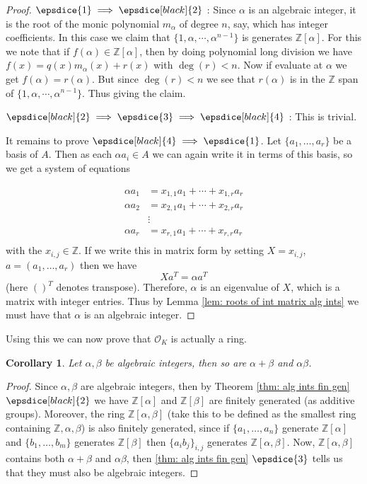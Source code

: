 \documentclass[11pt,a4paper]{report}
\theoremstyle{plain}
\newtheorem{cor}[subsection]{Corollary}
\theoremstyle{definition}
\theoremstyle{definition}
\newcommand{\ZZ}{\mathbb{Z}}
\def\edbb{\epsdice[black]{2}}
\def \a{\alpha}
\def \OO {\mathcal{O}}
\begin{document}
	\begin{proof}
		$\epsdice{1} \implies \epsdice[black]{2}$ : Since $\a$ is an algebraic integer, it is the root of the monic polynomial $m_\a$ of degree $n$, say, which has integer coefficients. In this case we claim that $\{1,\a,\cdots,\a^{n-1}\}$ is generates $\ZZ[\a]$. For this we note that if $f(\a) \in \ZZ[\a]$, then by doing polynomial long division we have $f(x)=q(x)m_\a(x)+r(x)$ with $\deg(r)<n$. Now if evaluate at $\a$ we get $f(\a)=r(\a)$. But since $\deg(r)<n$ we see that $r(\a)$ is in the $\ZZ$ span of  $\{1,\a,\cdots,\a^{n-1}\}$. Thus giving the claim.
		
		$\epsdice[black]{2} \implies \epsdice{3} \implies \epsdice[black]{4}$ : This is trivial.
		
		It remains to prove $\epsdice[black]{4} \implies \epsdice{1}$. Let $\{a_1,\dots,a_r\}$ be a basis of $A$. Then as each $\a a_i \in A$ we can again write it in terms of this basis, so we get a system of equations 
		
		\begin{align*}
			\a a_1 &=x_{1,1} a_1+\cdots+x_{1,r}a_r  \\
			\a a_2 &=x_{2,1} a_1+\cdots+x_{2,r}a_r  \\
			&\vdots \\
			\a a_r &=x_{r,1} a_1+\cdots+x_{r,r}a_r  \\
		\end{align*}
		with the $x_{i,j} \in \ZZ$. If we write this in matrix form by setting $X={x_{i,j}}$, $a=(a_1,\dots,a_r)$ then we have \[X a^{T}=\a a^{T}\] (here $()^T$ denotes transpose). Therefore, $\a$ is an eigenvalue of $X$, which is a matrix with integer entries. Thus by Lemma \ref{lem: roots of int matrix alg ints} we must have that $\a$ is an algebraic integer.
		
	\end{proof}
	
	
	
	Using this we can now prove that $\OO_K$ is actually a ring.
	
	\begin{cor}\label{cor: sum and mult of alg ints is alg ints}
		Let $\a,\beta$ be algebraic integers, then so are $\a+\beta$ and $\a \beta$.
	\end{cor}
	
	\begin{proof}
		Since $\a,\beta$ are algebraic integers, then by Theorem \ref{thm: alg ints fin gen} $\edbb$ we have $\ZZ[\a]$ and $\ZZ[\beta]$ are finitely generated (as additive groups). Moreover, the ring $\ZZ[\a,\beta]$ (take this to be defined as the smallest ring containing $\ZZ,\a,\beta$) is also finitely generated, since if $\{a_1,\dots,a_n\}$ generate $\ZZ[\a]$ and $\{b_1,\dots,b_m\}$ generates $\ZZ[\beta]$ then $\{a_ib_j\}_{i,j}$ generates $\ZZ[\a,\beta]$. Now, $\ZZ[\a,\beta]$ contains both $\a+\beta$ and $\a\beta$, then \ref{thm: alg ints fin gen} $\epsdice{3}$ tells us that they must also be algebraic integers.
	\end{proof}
	
\end{document}
